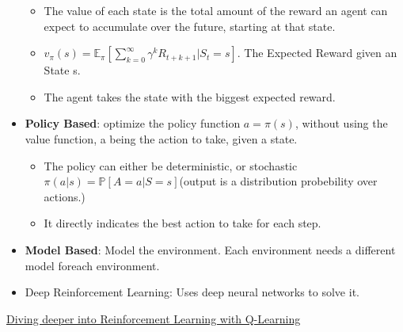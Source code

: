 \begin{itemize}[noitemsep,nolistsep]
	\begin{itemize}[noitemsep,nolistsep]
		\item The value of each state is the total amount of the reward an agent can expect to accumulate over the future, starting at that state.
		\item $v_\pi(s) = \mathbb{E}_\pi [\sum_{k=0}^\infty \gamma^k R_{t+k+1} | S_t = s]$. The Expected Reward given an State s.
		\item The agent takes the state with the biggest expected reward.
	\end{itemize} 
	\item \textbf{Policy Based}: optimize the policy function $a = \pi(s)$, without using the value function, a being the action to take, given a state.
	\begin{itemize}[noitemsep,nolistsep]
		\item The policy can either be deterministic, or stochastic $\pi(a|s) = \mathbb{P}[A=a|S=s]$(output is a distribution probebility over actions.)
		\item It directly indicates the best action to take for each step.
	\end{itemize} 
	\item \textbf{Model Based}: Model the environment. Each environment needs a different model foreach environment.
	\item Deep Reinforcement Learning: Uses deep neural networks to solve it.
\end{itemize}
\href{https://www.freecodecamp.org/news/diving-deeper-into-reinforcement-learning-with-q-learning-c18d0db58efe/}{Diving deeper into Reinforcement Learning with Q-Learning}
